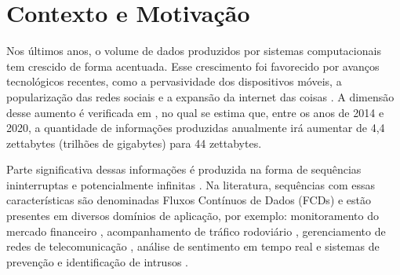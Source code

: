 \documentclass[qual, classic, a4paper]{ufbathesis}
\begin{document}

\tableofcontents

\listoffigures

\listoftables

\listofalgorithms

\mainmatter

% 
% 
% 
%

 \label{introducao}

\section{Contexto e Motivação}

Nos últimos anos, o volume de dados produzidos por sistemas computacionais tem crescido de forma acentuada.
%
Esse crescimento foi favorecido por avanços tecnológicos recentes, como  
a pervasividade dos dispositivos móveis,
a popularização das redes sociais e 
a expansão da internet das coisas \cite{Cohen:BigData:2009:MSN:1687553.1687576}.
%
A dimensão desse aumento é verificada em , 
no qual se estima que, entre os anos de 2014 e 2020,
a quantidade de informações produzidas anualmente irá aumentar de 4,4 zettabytes (trilhões de gigabytes) para 44 zettabytes.

Parte significativa dessas informações é produzida na forma de sequências ininterruptas e potencialmente infinitas \cite{Aggarwal:2006:DSM:1196418}.
%
Na literatura, sequências com essas características são denominadas Fluxos Contínuos de Dados (FCDs) e estão presentes em diversos domínios de aplicação, por exemplo:
monitoramento do mercado financeiro \cite{ZHOU:2015},
acompanhamento de tráfico rodoviário \cite{Wang:2015:EOV:2843092.2843464}, 
gerenciamento de redes de telecomunicação \cite{delattre2015method}, 
análise de sentimento em tempo real \cite{KRANJC2015187} e 
sistemas de prevenção e identificação de intrusos \cite{KENKRE:PAI:COLACO:2015}.
\end{document}
